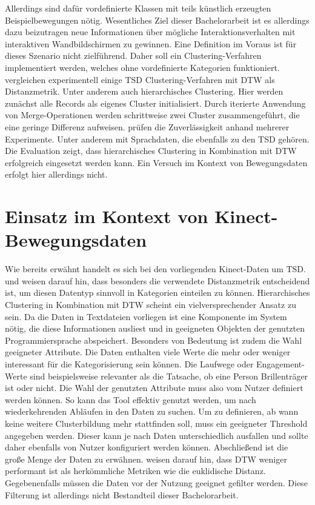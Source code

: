 Allerdings sind dafür vordefinierte Klassen mit teils künstlich erzeugten Beispielbewegungen nötig.
Wesentliches Ziel dieser Bachelorarbeit ist es allerdings dazu beizutragen neue Informationen
über mögliche Interaktionsverhalten mit interaktiven Wandbildschirmen zu gewinnen.
Eine Definition im Voraus ist für dieses Szenario nicht zielführend.
Daher soll ein Clustering-Verfahren implementiert werden,
welches ohne vordefinierte Kategorien funktioniert.
\citet{hautamaki_time-series_2008} vergleichen experimentell einige \ac*{TSD} Clustering-Verfahren
mit \ac{DTW} als Distanzmetrik.
Unter anderem auch hierarchisches Clustering.
Hier werden zunächst alle Records als eigenes Cluster initialisiert.
Durch iterierte Anwendung von Merge-Operationen werden schrittweise zwei Cluster zusammengeführt,
die eine geringe Differenz aufweisen.
\citet{hautamaki_time-series_2008} prüfen die Zuverlässigkeit anhand mehrerer Experimente.
Unter anderem mit Sprachdaten, die ebenfalls zu den \ac{TSD} gehören.
Die Evaluation zeigt, dass hierarchisches Clustering in Kombination mit \ac{DTW} erfolgreich eingesetzt werden kann.
Ein Versuch im Kontext von Bewegungsdaten erfolgt hier allerdings nicht.

\section{Einsatz im Kontext von Kinect-Bewegungsdaten}
\label{3-Einsatz}
Wie bereits erwähnt handelt es sich bei den vorliegenden Kinect-Daten um \ac{TSD}.
\citet{warren_liao_clustering_2005} und \citet{aghabozorgi_time-series_2015} weisen darauf hin,
dass besonders die verwendete Distanzmetrik entscheidend ist,
um diesen Datentyp sinnvoll in Kategorien einteilen zu können.
Hierarchisches Clustering in Kombination mit \ac{DTW} scheint ein vielversprechender Ansatz zu sein.
Da die Daten in Textdateien vorliegen ist eine Komponente im System nötig,
die diese Informationen ausliest und in geeigneten Objekten der genutzten Programmiersprache abspeichert.
Besonders von Bedeutung ist zudem die Wahl geeigneter Attribute.
Die Daten enthalten viele Werte die mehr oder weniger interessant für die Kategorisierung sein können.
Die Laufwege oder Engagement-Werte sind beispielsweise relevanter als die Tatsache,
ob eine Person Brillenträger ist oder nicht.
Die Wahl der genutzten Attribute muss also vom Nutzer definiert werden können.
So kann das Tool effektiv genutzt werden, um nach wiederkehrenden Abläufen in den Daten zu suchen.
Um zu definieren, ab wann keine weitere Clusterbildung mehr stattfinden soll, muss ein geeigneter Threshold angegeben werden.
Dieser kann je nach Daten unterschiedlich ausfallen
und sollte daher ebenfalls von Nutzer konfiguriert werden können.
Abschließend ist die große Menge der Daten zu erwähnen.
\citet{aghabozorgi_time-series_2015} weisen darauf hin,
dass \ac{DTW} weniger performant ist als herkömmliche Metriken wie die euklidische Distanz.
Gegebenenfalls müssen die Daten vor der Nutzung geeignet gefilter werden.
Diese Filterung ist allerdings nicht Bestandteil dieser Bachelorarbeit.
